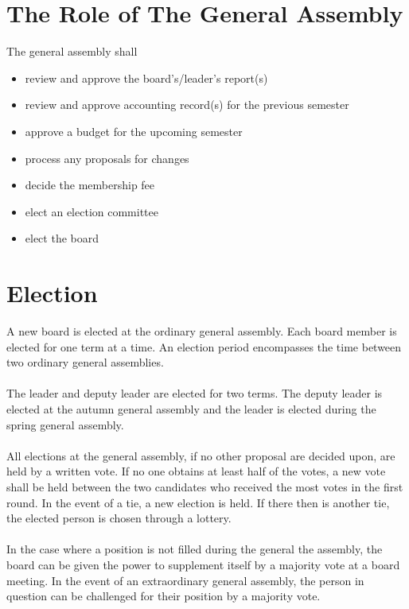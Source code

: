 \documentclass[12pt,a4paper,norsk]{article}
\begin{document}
\section{The Role of The General Assembly}

The general assembly shall

\begin{itemize}
    \item review and approve the board's/leader's report(s)
    \item review and approve accounting record(s) for the previous semester
    \item approve a budget for the upcoming semester
    \item process any proposals for changes
    \item decide the membership fee
    \item elect an election committee
    \item elect the board
\end{itemize}



\section{Election}

A new board is elected at the ordinary general assembly. Each board member is elected for one term at a time. An election period encompasses the time between two ordinary general assemblies.
\\
\\
The leader and deputy leader are elected for two terms. The deputy leader is elected at the autumn general assembly and the leader is elected during the spring general assembly.
\\
\\
All elections at the general assembly, if no other proposal are decided upon, are held by a written vote. If no one obtains at least half of the votes, a new vote shall be held between the two candidates who received the most votes in the first round. In the event of a tie, a new election is held. If there then is another tie, the elected person is chosen through a lottery.
\\
\\
In the case where a position is not filled during the general the assembly, the board can be given the power to supplement itself by a  majority vote at a board meeting. In the event of an extraordinary general assembly, the person in question can be challenged for their position by a  majority vote.
\end{document}
